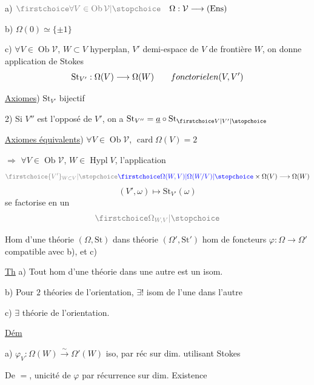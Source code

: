 a) $\deleted{\unsure{\forall V\in\operatorname{Ob}\mathcal V}}\quad\Omega:\mathcal V\longrightarrow(\mathrm{Ens})$

b) $\Omega(0)\simeq\{\pm1\}$

c) $\forall V\in\operatorname{Ob}\mathcal V$, $W\subset V$ hyperplan, $V'$ demi-espace de $V$ de frontière $W$, on donne application de Stokes
\[
\mathrm{St}_{V'}:\Omega(V)\longrightarrow\Omega(W)\qquad fonctoriel en(V,V')
\]

\uline{Axiomes}) $\mathrm{St}_{V'}$ bijectif 


2) Si $V''$ est l'opposé de $V'$, on a $\mathrm{St}_{V''}=\underline a\circ\mathrm{St}_{\unsure{V|V'}}$

\uline{Axiomes équivalents}) $\forall V\in\operatorname{Ob}\mathcal V$, $\operatorname{card}\Omega(V)=2$

$\Rightarrow$ $\forall V\in\operatorname{Ob}\mathcal V$, $W\in\operatorname{Hypl}V$,  l'application
\[
\deleted{\unsure{\{V'\}_{W\subset V}}}\inserted{\unsure{\Omega(W,V)|\Omega(W/V)}}\times\Omega(V)\longrightarrow\Omega(W)
\]
\[
(V',\omega)\longmapsto\mathrm{St}_{V'}(\omega)
\]
se factorise en un  
\[
\deleted{\unsure{\Omega_{W,V}}}
\]

 Hom d'une théorie $(\Omega,\mathrm{St})$ dans théorie $(\Omega',\mathrm{St}')$ hom de foncteurs $\varphi:\Omega\longrightarrow\Omega'$ compatible avec b), et c)

\uline{Th}\quad {} a) Tout hom d'une théorie dans une autre est un isom.

b) Pour $2$ théories de l'orientation, $\exists!$ isom de l'une dans l'autre

c) $\exists$ théorie de l'orientation.

\uline{Dém}

a) $\varphi_V:\Omega(W)\xrightarrow{\sim}\Omega'(W)$ iso, par réc sur dim. utilisant Stokes

De $=$, unicité de $\varphi$ par récurrence sur dim. Existence 

